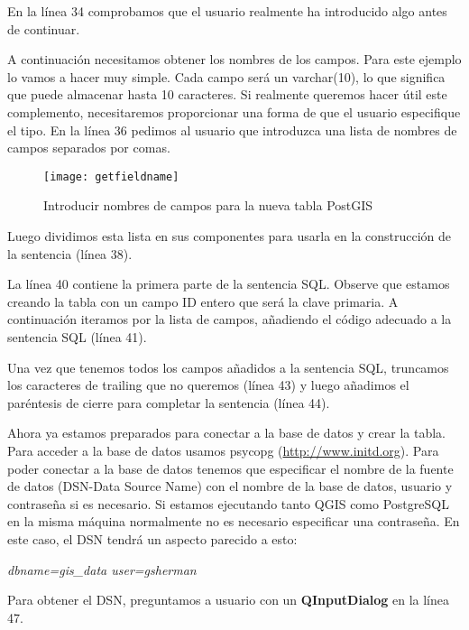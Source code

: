 En la línea 34 comprobamos que el usuario realmente ha introducido algo antes de continuar.

A continuación necesitamos obtener los nombres de los campos. Para este ejemplo lo vamos a hacer muy simple. 
Cada campo será un varchar(10), lo que significa que puede almacenar hasta 10 caracteres. Si realmente queremos 
hacer útil este complemento, necesitaremos proporcionar una forma de que el usuario especifique el tipo. En 
la línea 36 pedimos al usuario que introduzca una lista de nombres de campos separados por comas.

\begin{figure}[ht]
\begin{center}
  \caption{Introducir nombres de campos para la nueva tabla PostGIS}\label{fig:getfieldname}\smallskip
  \texttt{[image: getfieldname]}
\end{center}
\end{figure}

Luego dividimos esta lista en sus componentes para usarla en la construcción de la sentencia (línea 38). 

La línea 40 contiene la primera parte de la sentencia SQL. Observe que estamos creando la tabla con un campo 
ID entero que será la clave primaria. A continuación iteramos por la lista de campos, añadiendo el código 
adecuado a la sentencia SQL (línea 41).

Una vez que tenemos todos los campos añadidos a la sentencia SQL, truncamos los caracteres de trailing que no 
queremos (línea 43) y luego añadimos el paréntesis de cierre para completar la sentencia (línea 44).

Ahora ya estamos preparados para conectar a la base de datos y crear la tabla. Para acceder a la base de datos 
usamos psycopg (\url{http://www.initd.org}). Para poder conectar a la base de datos tenemos que especificar 
el nombre de la fuente de datos (DSN-Data Source Name) con el nombre de la base de datos, usuario y contraseña 
si es necesario. Si estamos ejecutando tanto QGIS como PostgreSQL en la misma máquina normalmente no es 
necesario especificar una contraseña. En este caso, el DSN tendrá un aspecto parecido a esto:

\begin{center}
  \textsl{dbname=gis\_data user=gsherman}
\end{center}

Para obtener el DSN, preguntamos a usuario con un \textbf{QInputDialog} en la línea 47.

